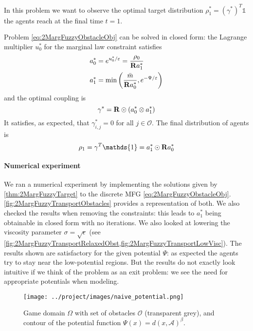 \documentclass[../report.tex]{subfiles}
\begin{document}
In this problem we want to observe the optimal target distribution $\rho^*_1 = (\gamma^*)^T\mathds{1}$ the agents reach at the final time $t=1$.

\begin{prop}\label{thm:2MargFuzzyTarget}
Problem \eqref{eq:2MargFuzzyObstacleObj} can be solved in closed form: the Lagrange multiplier $u_0^*$ for the marginal law constraint satisfies
\begin{align*}
	a_0^* &= e^{u_0^*/\varepsilon}  = \frac{\rho_0}{\mathbf{R} a^*_1}  \\
	a_1^* &= \min\left(\frac{\bar{m}}{\mathbf{R} a_0^*}, e^{-\Psi/\varepsilon}\right)
\end{align*}
and the optimal coupling is
\[
	\gamma^* = \mathbf{R}\odot (a_0^* \otimes a_1^*)	
\]
It satisfies, as expected, that $\gamma^*_{i,j} = 0$ for all $j\in\mathscr{O}$. The final distribution of agents is
\[
	\rho_1 = \gamma^T\mathds{1} = a_1^* \odot \bfR a_0^*
\]
\end{prop}

 
\paragraph{Numerical experiment} We ran a numerical experiment by implementing the solutions given by \cref{thm:2MargFuzzyTarget} to the discrete MFG \eqref{eq:2MargFuzzyObstacleObj}. \cref{fig:2MargFuzzyTransportObstacles} provides a representation of both. We also checked the results when removing the constraints: this leads to $a^*_1$ being obtainable in closed form with no iterations. We also looked at lowering the viscosity parameter $\sigma = \sqrt{\epsilon}$ (see \cref{fig:2MargFuzzyTransportRelaxedObst,fig:2MargFuzzyTransportLowVisc}). The results shown are satisfactory for the given potential $\Psi$: as expected the agents try to stay near the low-potential regions. But the results do not exactly look intuitive if we think of the problem as an exit problem: we see the need for appropriate potentials when modeling.

\begin{figure}[h]
	\centering
	\texttt{[image: ../project/images/naive\_potential.png]}
	\caption{Game domain $\Omega$ with set of obstacles $\mathscr{O}$ (transparent grey), and contour of the potential function $\Psi(x) = d(x, \mathscr A)^\beta$.} \label{fig:CrowdExamplePotential}	
\end{figure}
\end{document}
